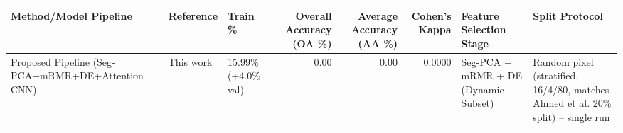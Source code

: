 \begin{tabular}{lllrrrll}
\toprule
Method/Model Pipeline & Reference & Train \% & Overall Accuracy (OA \%) & Average Accuracy (AA \%) & Cohen's Kappa & Feature Selection Stage & Split Protocol \\
\midrule
Proposed Pipeline (Seg-PCA+mRMR+DE+Attention CNN) & This work & 15.99\% (+4.0\% val) & 0.00 & 0.00 & 0.0000 & Seg-PCA + mRMR + DE (Dynamic Subset) & Random pixel (stratified, 16/4/80, matches Ahmed et al. 20\% split) -- single run \\
\bottomrule
\end{tabular}
